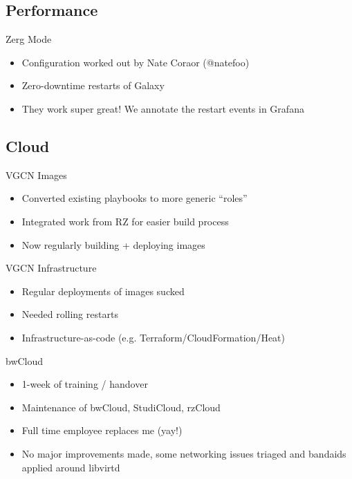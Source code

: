 \documentclass[12pt]{ufrslides}
\begin{document}
\subsection{Performance}
	\begin{frame}{Zerg Mode}
		\begin{itemize}
			\item Configuration worked out by Nate Coraor (@natefoo)
			\item Zero-downtime restarts of Galaxy
			\item They work super great! We annotate the restart events in Grafana
		\end{itemize}
	\end{frame}

\subsection{Cloud}
	\begin{frame}{VGCN Images}
		\begin{itemize}
			\item Converted existing playbooks to more generic ``roles''
			\item Integrated work from RZ for easier build process
			\item Now regularly building + deploying images
		\end{itemize}
	\end{frame}

	\begin{frame}{VGCN Infrastructure}
		\begin{itemize}
			\item Regular deployments of images sucked
			\item Needed rolling restarts
			\item Infrastructure-as-code (e.g. Terraform/CloudFormation/Heat)
		\end{itemize}
	\end{frame}

	\begin{frame}{bwCloud}
		\begin{itemize}
			\item 1-week of training / handover
			\item Maintenance of bwCloud, StudiCloud, rzCloud
			\item Full time employee replaces me (yay!)
			\item No major improvements made, some networking issues triaged and bandaids applied around libvirtd
		\end{itemize}
	\end{frame}
\end{document}
